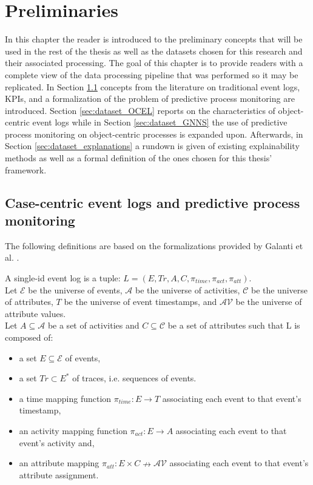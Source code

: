 
\chapter{Preliminaries}
\label{chp:preliminaries}
    In this chapter the reader is introduced to the preliminary concepts that will be used in the rest of the thesis as well as the datasets chosen for this research and their associated processing. The goal of this chapter is to provide readers with a complete view of the data processing pipeline that was performed so it may be replicated.
    In Section \ref{sec:dataset_event_logs} concepts from the literature on traditional event logs, KPIs, and a formalization of the problem of predictive process monitoring are introduced. Section \ref{sec:dataset_OCEL} reports on the characteristics of object-centric event logs while in Section \ref{sec:dataset_GNNS} the use of predictive process monitoring on object-centric processes is expanded upon. Afterwards, in Section \ref{sec:dataset_explanations} a rundown is given of existing explainability methods as well as a formal definition of the ones chosen for this thesis' framework.

    \section{Case-centric event logs and predictive process monitoring}
    \label{sec:dataset_event_logs}
        The following definitions are based on the formalizations provided by Galanti et al. \cite{galanti2023a}.

        \begin{definition}
        \label{def:sing_id_ev_log}
            A single-id event log is a tuple: $L = (E, Tr, A, C, \pi_{time}, \pi_{act}, \pi_{att})$.\\ 
            Let $\mathcal{E}$ be the universe of events, $\mathcal{A}$ be the universe of activities, $\mathcal{C}$ be the universe of attributes, $T$ be the universe of event timestamps, and $\mathcal{AV}$ be the universe of attribute values. \\
            Let $A\subseteq \mathcal{A}$ be a set of activities and $C\subseteq \mathcal{C}$ be a set of attributes such that L is composed of:
            \begin{itemize}
                \item a set $E\subseteq\mathcal{E}$ of events,
                \item a set $Tr \subset E^*$ of traces, i.e. sequences of events.
                \item a time mapping function $\pi_{time}: E \to T$ associating each event to that event's timestamp,
                \item an activity mapping function $\pi_{act}: E \to A$ associating each event to that event's activity and,
                \item an attribute mapping $\pi_{att}:E\times C \nrightarrow \mathcal{AV}$ associating each event to that event's attribute assignment.
            \end{itemize}
        \end{definition}
        

